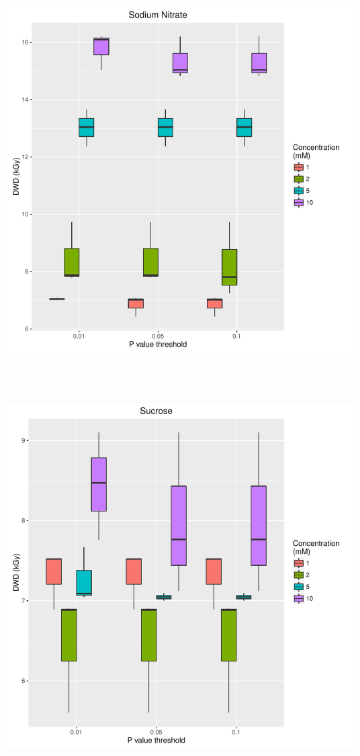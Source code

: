 \begin{figure}
\begin{subfigure}[b]{0.75\textwidth}
            \caption{}
            \label{}
    \end{subfigure}
\end{figure}
\begin{figure}
    \centering
    \begin{subfigure}[b]{0.75\textwidth}
            \centering
            \includegraphics[width=\textwidth]{figures/saxs/Sodium_Nitrate_PThresh_comp.pdf}
            \caption{}
            \label{}
    \end{subfigure}
    \\
    \begin{subfigure}[b]{0.75\textwidth}
            \centering
            \includegraphics[width=\textwidth]{figures/saxs/Sucrose_PThresh_comp.pdf}

\end{subfigure}
\end{figure}
